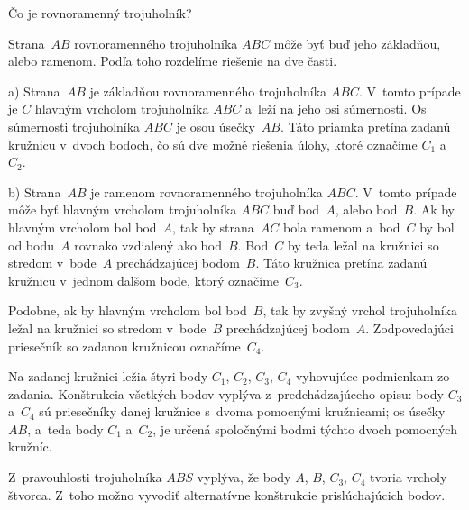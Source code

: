 {%
\napad
Čo je rovnoramenný trojuholník?

\riesenie
Strana~$AB$ rovnoramenného trojuholníka $ABC$ môže byť buď jeho základňou, alebo ramenom.
Podľa toho rozdelíme riešenie na dve časti.

a) Strana~$AB$ je základňou rovnoramenného trojuholníka $ABC$.
V~tomto prípade je $C$ hlavným vrcholom trojuholníka $ABC$ a~leží na jeho osi súmernosti.
Os súmernosti trojuholníka $ABC$ je osou úsečky~$AB$.
Táto priamka pretína zadanú kružnicu v~dvoch bodoch, čo sú dve možné riešenia úlohy, ktoré označíme $C_1$ a~$C_2$.

b) Strana~$AB$ je ramenom rovnoramenného trojuholníka $ABC$.
V~tomto prípade môže byť hlavným vrcholom trojuholníka $ABC$ buď bod~$A$, alebo bod~$B$.
Ak by hlavným vrcholom bol bod~$A$, tak by strana~$AC$ bola ramenom a~bod~$C$ by bol od bodu~$A$ rovnako vzdialený ako bod~$B$.
Bod~$C$ by teda ležal na kružnici so stredom v~bode~$A$ prechádzajúcej bodom~$B$.
Táto kružnica pretína zadanú kružnicu v~jednom ďalšom bode, ktorý označíme~$C_3$.

Podobne, ak by hlavným vrcholom bol bod~$B$, tak by zvyšný vrchol trojuholníka ležal na kružnici so stredom v~bode~$B$ prechádzajúcej bodom~$A$.
Zodpovedajúci priesečník so zadanou kružnicou označíme~$C_4$.

\smallskip
Na zadanej kružnici ležia štyri body $C_1$, $C_2$, $C_3$, $C_4$ vyhovujúce podmienkam zo zadania.
Konštrukcia všetkých bodov vyplýva z~predchádzajúceho opisu:
body $C_3$ a~$C_4$ sú priesečníky danej kružnice s~dvoma pomocnými kružnicami;
os úsečky~$AB$, a~teda body $C_1$ a~$C_2$, je určená spoločnými bodmi týchto dvoch pomocných kružníc.
%


\poznamka
Z~pravouhlosti trojuholníka $ABS$ vyplýva, že body $A$, $B$, $C_3$, $C_4$ tvoria vrcholy štvorca.
Z~toho možno vyvodiť alternatívne konštrukcie prislúchajúcich bodov.

}


